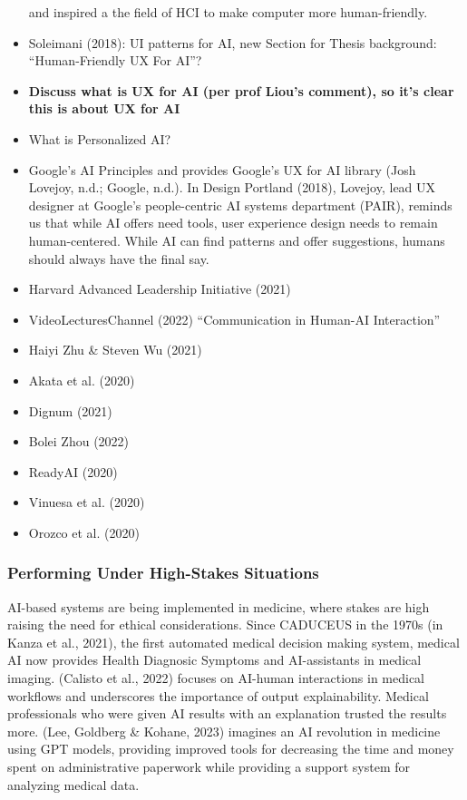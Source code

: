 \documentclass[
  letterpaper,
  DIV=11,
  numbers=noendperiod]{scrartcl}
\begin{document}
\begin{itemize}
  and inspired a the field of HCI to make computer more human-friendly.
\item
  Soleimani (2018): UI patterns for AI, new Section for Thesis
  background: ``Human-Friendly UX For AI''?
\item
  \textbf{Discuss what is UX for AI (per prof Liou's comment), so it's
  clear this is about UX for AI}
\item
  What is Personalized AI?
\item
  Google's AI Principles and provides Google's UX for AI library (Josh
  Lovejoy, n.d.; Google, n.d.). In Design Portland (2018), Lovejoy, lead
  UX designer at Google's people-centric AI systems department (PAIR),
  reminds us that while AI offers need tools, user experience design
  needs to remain human-centered. While AI can find patterns and offer
  suggestions, humans should always have the final say.
\item
  Harvard Advanced Leadership Initiative (2021)
\item
  VideoLecturesChannel (2022) ``Communication in Human-AI Interaction''
\item
  Haiyi Zhu \& Steven Wu (2021)
\item
  Akata et al. (2020)
\item
  Dignum (2021)
\item
  Bolei Zhou (2022)
\item
  ReadyAI (2020)
\item
  Vinuesa et al. (2020)
\item
  Orozco et al. (2020)
\end{itemize}

\subsubsection{Performing Under High-Stakes
Situations}\label{performing-under-high-stakes-situations}

AI-based systems are being implemented in medicine, where stakes are
high raising the need for ethical considerations. Since CADUCEUS in the
1970s (in Kanza et al., 2021), the first automated medical decision
making system, medical AI now provides Health Diagnosic Symptoms and
AI-assistants in medical imaging. (Calisto et al., 2022) focuses on
AI-human interactions in medical workflows and underscores the
importance of output explainability. Medical professionals who were
given AI results with an explanation trusted the results more. (Lee,
Goldberg \& Kohane, 2023) imagines an AI revolution in medicine using
GPT models, providing improved tools for decreasing the time and money
spent on administrative paperwork while providing a support system for
analyzing medical data.
\end{document}
